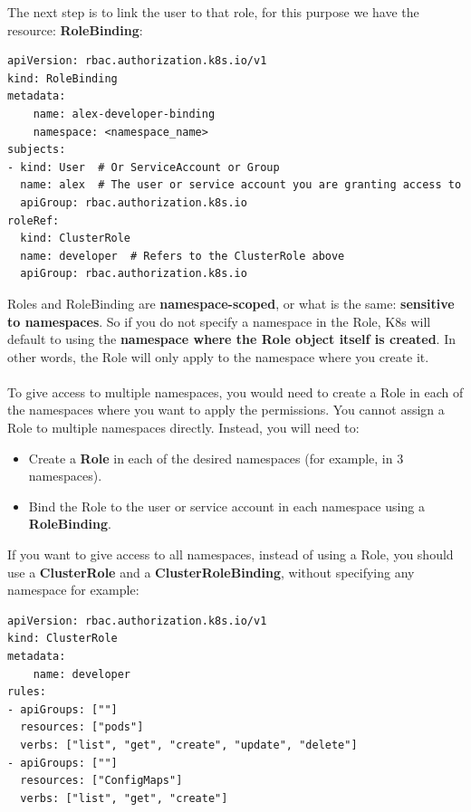 \documentclass{article}
\newenvironment{blocktemplateII}[1]{%
    \tcolorbox[beamer,%
    noparskip,breakable,
    colframe=Green,%
    colbacklower=LimeGreen!75!LightGreen,%
    title=#1]}%
    {\endtcolorbox}
\newenvironment{codetemplate}[1][]{%
  \mybasecolorbox[#1]
  \itshape
}{%
  \endmybasecolorbox
}
\begin{document}
The next step is to link the user to that role, for this purpose we have the resource: \textbf{RoleBinding}:
\begin{codetemplate}{}
\begin{verbatim}
apiVersion: rbac.authorization.k8s.io/v1
kind: RoleBinding
metadata:
    name: alex-developer-binding
    namespace: <namespace_name>
subjects:
- kind: User  # Or ServiceAccount or Group
  name: alex  # The user or service account you are granting access to
  apiGroup: rbac.authorization.k8s.io
roleRef:
  kind: ClusterRole
  name: developer  # Refers to the ClusterRole above
  apiGroup: rbac.authorization.k8s.io
\end{verbatim}
\end{codetemplate}

\begin{blocktemplateII}{NOTE}
Roles and RoleBinding are \textbf{namespace-scoped}, or what is the same: \textbf{sensitive to namespaces}. So if you do not specify a namespace in the Role, K8s will default to using the \textbf{namespace where the Role object itself is created}. In other words, the Role will only apply to the namespace where you create it.
\\\\
To give access to multiple namespaces, you would need to create a Role in each of the namespaces where you want to apply the permissions. You cannot assign a Role to multiple namespaces directly. Instead, you will need to:
\begin{itemize}
    \item Create a \textbf{Role} in each of the desired namespaces (for example, in 3 namespaces).
    \item Bind the Role to the user or service account in each namespace using a \textbf{RoleBinding}.
\end{itemize}
If you want to give access to all namespaces, instead of using a Role, you should use a \textbf{ClusterRole} and a \textbf{ClusterRoleBinding}, without specifying any namespace for example:

\begin{codetemplate}{}
\begin{verbatim}
apiVersion: rbac.authorization.k8s.io/v1
kind: ClusterRole
metadata:
    name: developer
rules:
- apiGroups: [""]
  resources: ["pods"]
  verbs: ["list", "get", "create", "update", "delete"]
- apiGroups: [""]
  resources: ["ConfigMaps"]
  verbs: ["list", "get", "create"]
\end{verbatim}
\end{codetemplate}


\end{blocktemplateII}
\end{document}
